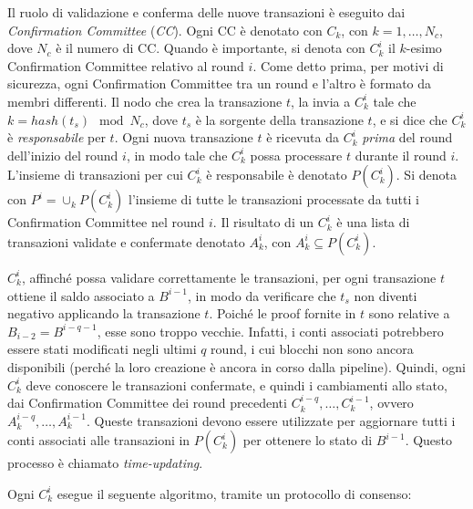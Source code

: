 Il ruolo di validazione e conferma delle nuove transazioni è eseguito dai \emph{Confirmation Committee} (\emph{CC}). Ogni CC è denotato con $C_k$, con $k = 1, \dots, N_c$, dove $N_c$ è il numero di CC. Quando è importante, si denota con $C_k^i$ il $k$-esimo Confirmation Committee relativo al round $i$. Come detto prima, per motivi di sicurezza, ogni Confirmation Committee tra un round e l'altro è formato da membri differenti. Il nodo che crea la transazione $t$, la invia a $C_k^i$ tale che $k = hash(t_s) \mod N_c$, dove $t_s$ è la sorgente della transazione $t$, e si dice che $C_k^i$ è \emph{responsabile} per $t$. Ogni nuova transazione $t$ è ricevuta da $C_k^i$ \emph{prima} del round dell'inizio del round $i$, in modo tale che $C_k^i$ possa processare $t$ durante il round $i$. L'insieme di transazioni per cui $C_k^i$ è responsabile è denotato $P(C_k^i)$. Si denota con $P^i = \cup_k P(C_k^i)$ l'insieme di tutte le transazioni processate da tutti i Confirmation Committee nel round $i$. Il risultato di un $C_k^i$ è una lista di transazioni validate e confermate denotato $A_k^i$, con $A_k^i \subseteq P(C_k^i)$.

$C_k^i$, affinché possa validare correttamente le transazioni, per ogni transazione $t$ ottiene il saldo associato a $B^{i-1}$, in modo da verificare che $t_s$ non diventi negativo applicando la transazione $t$. Poiché le proof fornite in $t$ sono relative a $B_{i-2} = B^{i-q-1}$, esse sono troppo vecchie. Infatti, i conti associati potrebbero essere stati modificati negli ultimi $q$ round, i cui blocchi non sono ancora disponibili (perché la loro creazione è ancora in corso dalla pipeline). Quindi, ogni $C_k^i$ deve conoscere le transazioni confermate, e quindi i cambiamenti allo stato, dai Confirmation Committee dei round precedenti $C_k^{i-q}, \dots, C_k^{i-1}$, ovvero $A_k^{i-q}, \dots, A_k^{i-1}$. Queste transazioni devono essere utilizzate per aggiornare tutti i conti associati alle transazioni in $P(C_k^i)$ per ottenere lo stato di $B^{i-1}$. Questo processo è chiamato \emph{time-updating}.

Ogni $C_k^i$ esegue il seguente algoritmo, tramite un protocollo di consenso:

